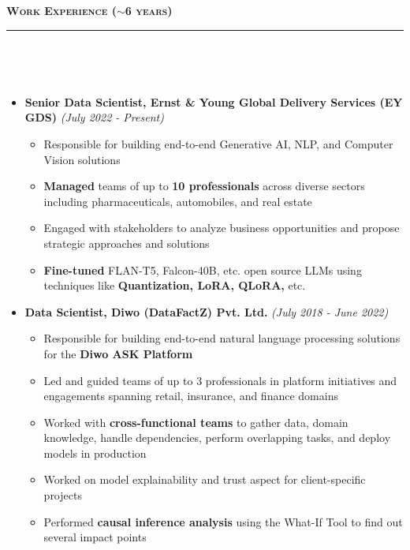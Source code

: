 \documentclass[a4paper,10pt]{article}
\newcommand{\isep}{-2 pt}
\newcommand{\lsep}{-0.5cm}
\newcommand{\resheading}[1]{{\small
        {
            \begin{minipage}
                {0.992\textwidth}\textbf{{\textsc{#1 \vphantom{p\^{E}} }}}
                \\[-0.3cm]
                \hrule
            \end{minipage}
            \\[-0.5cm]
        }
 }}
\begin{document}
\noindent
\resheading{\textbf{\large Work Experience ($\sim$6 years)}}\\[\lsep]
\begin{itemize}

    \item \textbf{Senior Data Scientist, Ernst \& Young Global Delivery Services (EY GDS)} \hfill {\emph{(July 2022 - Present)}}
    \\ [-0.6cm]
    \begin{itemize}\itemsep \isep
        \item Responsible for building end-to-end Generative AI, NLP, and Computer Vision solutions
        \item \textbf{Managed} teams of up to \textbf{10 professionals} across diverse sectors including pharmaceuticals, automobiles, and real estate
        \item Engaged with stakeholders to analyze business opportunities and propose strategic approaches and solutions
        \item \textbf{Fine-tuned} FLAN-T5, Falcon-40B, etc. open source LLMs using techniques like \textbf{Quantization, LoRA, QLoRA,} etc.
    \\ [-0.5cm]
    \end{itemize}
    
    \item \textbf{Data Scientist, Diwo (DataFactZ) Pvt. Ltd.} \hfill {\emph{(July 2018 - June 2022)}}
    \\ [-0.6cm]
    \begin{itemize}\itemsep \isep
        \item Responsible for building end-to-end natural language processing solutions for the \textbf{Diwo ASK Platform}
        \item Led and guided teams of up to 3 professionals in platform initiatives and engagements spanning retail, insurance, and finance domains
        \item Worked with \textbf{cross-functional teams} to gather data, domain knowledge, handle dependencies, perform overlapping tasks, and deploy models in production  
        \item Worked on model explainability and trust aspect for client-specific projects
        \item Performed \textbf{causal inference analysis} using the What-If Tool to find out several impact points
    \\ [-0.5cm]
    \end{itemize}
    

\end{itemize}
\end{document}
